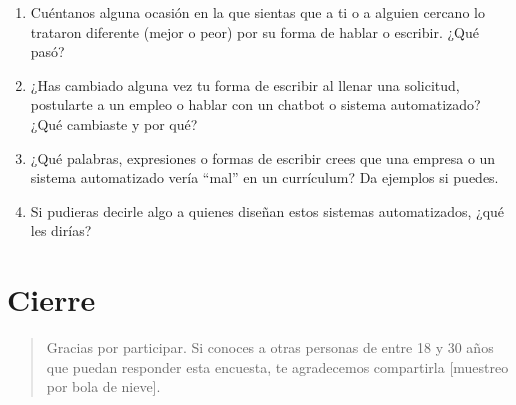 \begin{enumerate}[label=\textbf{A\arabic*.}]
  \item Cuéntanos alguna ocasión en la que sientas que a ti o a alguien
    cercano lo trataron diferente (mejor o peor) por su forma de hablar o
    escribir. ¿Qué pasó?
  \item ¿Has cambiado alguna vez tu forma de escribir al llenar una solicitud,
    postularte a un empleo o hablar con un chatbot o sistema automatizado?
    ¿Qué cambiaste y por qué?
  \item ¿Qué palabras, expresiones o formas de escribir crees que una empresa
    o un sistema automatizado vería ``mal'' en un currículum? Da ejemplos si
    puedes.
  \item Si pudieras decirle algo a quienes diseñan estos sistemas
    automatizados, ¿qué les dirías?
\end{enumerate}

\section*{Cierre}

\begin{quote}
Gracias por participar. Si conoces a otras personas de entre 18 y 30 años que
puedan responder esta encuesta, te agradecemos compartirla
[muestreo por bola de nieve].
\end{quote}

%
